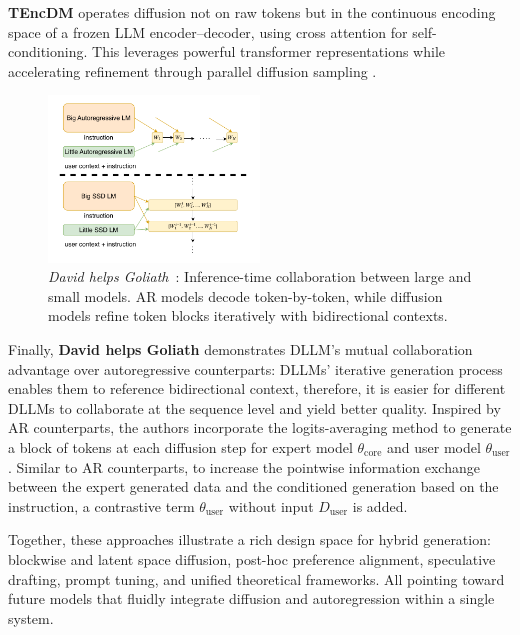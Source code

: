 \noindent \textbf{TEncDM} operates diffusion not on raw tokens but in the continuous encoding space of a frozen LLM encoder–decoder, using cross attention for self-conditioning. This leverages powerful transformer representations while accelerating refinement through parallel diffusion sampling \cite{shabalin_tencdm_2025}.  

\begin{figure}[h!]
    \centering
    \includegraphics[width=0.5\textwidth]{figs/David_helps_Goliath.pdf}
    \caption[\textit{David helps Goliath} collaboration framework]{%
        \textit{David helps Goliath}~\cite{han_david_2024}: Inference-time collaboration between large and small models. 
        AR models decode token-by-token, while diffusion models refine token blocks iteratively with bidirectional contexts.%
    }
    \label{fig:david_helps_goliath}
\end{figure}

\noindent Finally, \textbf{David helps Goliath} demonstrates DLLM's mutual collaboration advantage over autoregressive counterparts: DLLMs' iterative generation process enables them to reference bidirectional context, therefore, it is easier for different DLLMs to collaborate at the sequence level and yield better quality. Inspired by AR counterparts, the authors incorporate the logits-averaging method to generate a block of tokens at each diffusion step for expert model $\theta_{\mathrm{core}}$ and user model $\theta_{\mathrm{user}}$. Similar to AR counterparts, to increase the pointwise information exchange between the expert generated data and the conditioned generation based on the instruction, a contrastive term $\theta_{\mathrm{user}}$ without input $D_{\text{user}}$ is added.\cite{han_david_2024}



\noindent Together, these approaches illustrate a rich design space for hybrid generation: blockwise and latent space diffusion, post-hoc preference alignment, speculative drafting, prompt tuning, and unified theoretical frameworks. All pointing toward future models that fluidly integrate diffusion and autoregression within a single system.
